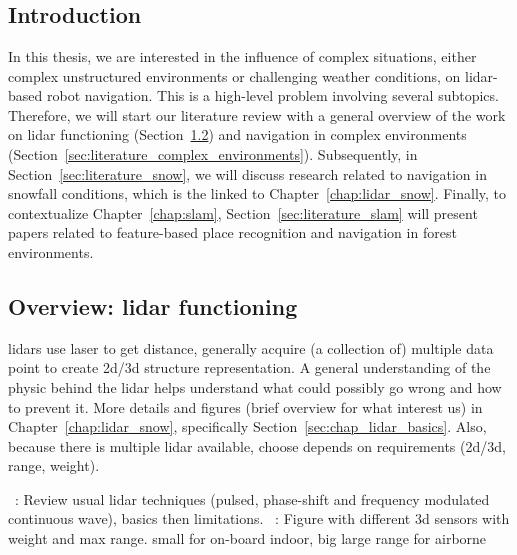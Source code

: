 \chapter{\chapzerotitle}
\label{chap:literature_review}


\section{Introduction}
In this thesis, we are interested in the influence of complex situations, either complex unstructured environments or challenging weather conditions, on \gls*{lidar}-based robot navigation. This is a high-level problem involving several subtopics. Therefore, we will start our literature review with a general overview of the work on \gls*{lidar} functioning (Section~\ref{sec:literature_lidar_functionning}) and navigation in complex environments (Section~\ref{sec:literature_complex_environments}).  Subsequently, in Section~\ref{sec:literature_snow}, we will discuss research related to navigation in snowfall conditions, which is the linked to Chapter~\ref{chap:lidar_snow}. Finally, to contextualize Chapter~\ref{chap:slam}, Section~\ref{sec:literature_slam} will present papers related to feature-based place recognition and navigation in forest environments. 


\section{Overview: \gls*{lidar} functioning}
\label{sec:literature_lidar_functionning}

\gls*{lidar}s use laser to get distance, generally acquire (a collection of) multiple data point to create 2d/3d structure representation.
A general understanding of the physic behind the lidar helps understand what could possibly go wrong and how to prevent it.
More details and figures (brief overview for what interest us) in Chapter~\ref{chap:lidar_snow}, specifically Section~\ref{sec:chap_lidar_basics}.
Also, because there is multiple lidar available, choose depends on requirements (2d/3d, range, weight).


~\cite{Bosch2001}:
Review usual lidar techniques (pulsed, phase-shift and frequency modulated continuous wave), basics then limitations.
~\cite{Pomerleau2015a}:
Figure with different 3d sensors with weight and max range. small for on-board indoor, big large range for airborne


